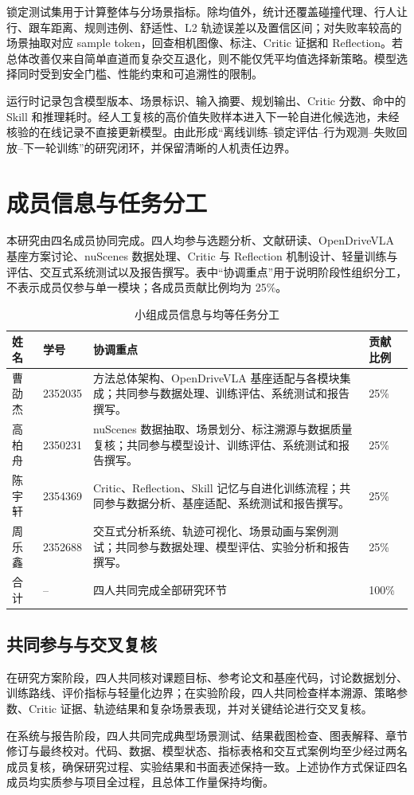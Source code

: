 \documentclass[UTF8,a4paper,12pt,fontset=fandol]{ctexart}
\renewcommand{\arraystretch}{1.20}
\begin{document}
锁定测试集用于计算整体与分场景指标。除均值外，统计还覆盖碰撞代理、行人让行、跟车距离、规则违例、舒适性、L2 轨迹误差以及置信区间；对失败率较高的场景抽取对应 sample token，回查相机图像、标注、Critic 证据和 Reflection。若总体改善仅来自简单直道而复杂交互退化，则不能仅凭平均值选择新策略。模型选择同时受到安全门槛、性能约束和可追溯性的限制。

运行时记录包含模型版本、场景标识、输入摘要、规划输出、Critic 分数、命中的 Skill 和推理耗时。经人工复核的高价值失败样本进入下一轮自进化候选池，未经核验的在线记录不直接更新模型。由此形成“离线训练--锁定评估--行为观测--失败回放--下一轮训练”的研究闭环，并保留清晰的人机责任边界。
\endgroup

\section{成员信息与任务分工}

本研究由四名成员协同完成。四人均参与选题分析、文献研读、OpenDriveVLA 基座方案讨论、nuScenes 数据处理、Critic 与 Reflection 机制设计、轻量训练与评估、交互式系统测试以及报告撰写。表中“协调重点”用于说明阶段性组织分工，不表示成员仅参与单一模块；各成员贡献比例均为 25\%。

\begin{table}[!htbp]
\centering
\small
\renewcommand{\arraystretch}{1.18}
\caption{小组成员信息与均等任务分工}
\begin{tabular}{P{0.12\textwidth}P{0.14\textwidth}P{0.52\textwidth}P{0.10\textwidth}}
\toprule
姓名 & 学号 & 协调重点 & 贡献比例 \\
\midrule
曹劭杰 & 2352035 & 方法总体架构、OpenDriveVLA 基座适配与各模块集成；共同参与数据处理、训练评估、系统测试和报告撰写。 & 25\% \\
高柏舟 & 2350231 & nuScenes 数据抽取、场景划分、标注溯源与数据质量复核；共同参与模型设计、训练评估、系统测试和报告撰写。 & 25\% \\
陈宇轩 & 2354369 & Critic、Reflection、Skill 记忆与自进化训练流程；共同参与数据分析、基座适配、系统测试和报告撰写。 & 25\% \\
周乐鑫 & 2352688 & 交互式分析系统、轨迹可视化、场景动画与案例测试；共同参与数据处理、模型评估、实验分析和报告撰写。 & 25\% \\
\midrule
合计 & -- & 四人共同完成全部研究环节 & 100\% \\
\bottomrule
\end{tabular}
\end{table}

\subsection*{共同参与与交叉复核}

在研究方案阶段，四人共同核对课题目标、参考论文和基座代码，讨论数据划分、训练路线、评价指标与轻量化边界；在实验阶段，四人共同检查样本溯源、策略参数、Critic 证据、轨迹结果和复杂场景表现，并对关键结论进行交叉复核。

在系统与报告阶段，四人共同完成典型场景测试、结果截图检查、图表解释、章节修订与最终校对。代码、数据、模型状态、指标表格和交互式案例均至少经过两名成员复核，确保研究过程、实验结果和书面表述保持一致。上述协作方式保证四名成员均实质参与项目全过程，且总体工作量保持均衡。
\end{document}

